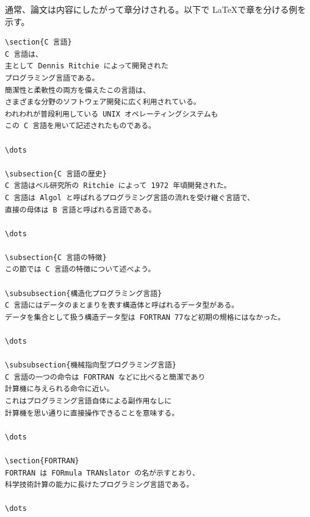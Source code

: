 通常、論文は内容にしたがって章分けされる。以下で \LaTeX で章を分ける例を示す。
\begin{reidai}
    \begin{verbatim}
\section{C 言語}
C 言語は、
主として Dennis Ritchie によって開発された
プログラミング言語である。
簡潔性と柔軟性の両方を備えたこの言語は、
さまざまな分野のソフトウェア開発に広く利用されている。
われわれが普段利用している UNIX オペレーティングシステムも
この C 言語を用いて記述されたものである。

\dots

\subsection{C 言語の歴史}
C 言語はベル研究所の Ritchie によって 1972 年頃開発された。
C 言語は Algol と呼ばれるプログラミング言語の流れを受け継ぐ言語で、
直接の母体は B 言語と呼ばれる言語である。

\dots

\subsection{C 言語の特徴}
この節では C 言語の特徴について述べよう。

\subsubsection{構造化プログラミング言語}
C 言語にはデータのまとまりを表す構造体と呼ばれるデータ型がある。
データを集合として扱う構造データ型は FORTRAN 77など初期の規格にはなかった。

\dots

\subsubsection{機械指向型プログラミング言語}
C 言語の一つの命令は FORTRAN などに比べると簡潔であり
計算機に与えられる命令に近い。
これはプログラミング言語自体による副作用なしに
計算機を思い通りに直接操作できることを意味する。

\dots

\section{FORTRAN}
FORTRAN は FORmula TRANslator の名が示すとおり、
科学技術計算の能力に長けたプログラミング言語である。

\dots
\end{verbatim}
\end{reidai} \noindent

